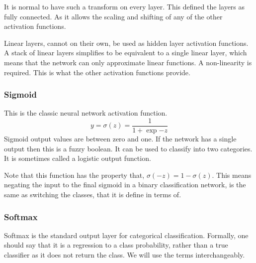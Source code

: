 \documentclass[12pt,parskip]{komatufte}
\begin{document}
It is normal to have such a transform on every layer.
This defined the layers as fully connected.
As it allows the scaling and shifting of any of the other activation functions.


Linear layers, cannot on their own, be used as hidden layer activation functions.
A stack of linear layers simplifies to be equivalent to a single linear layer, which means that the network can only approximate linear functions.
A non-linearity is required.
This is what the other activation functions provide.


\subsubsection{Sigmoid}


This is the classic neural network activation function.
\begin{equation}
y=\sigma(z)=\frac{1}{1+\exp{-z}}
\end{equation}
Sigmoid output values are between zero and one.
If the network has a single output then this is a fuzzy boolean.
It can be used to classify into two categories.
It is sometimes called a logistic output function.

Note that this function has the property that, $\sigma(-z)=1-\sigma(z)$.
This means negating the input to the final sigmoid in a binary classification network,
is the same as switching the classes, that it is define in terms of.

\subsubsection{Softmax}

Softmax is the standard output layer for categorical classification.
Formally, one should say that it is a regression to a class probability, rather than a true classifier as it does not return the class.
We will use the terms interchangeably.
\end{document}
